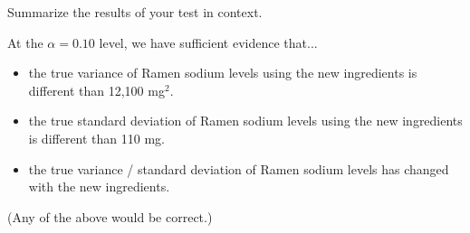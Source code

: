 \documentclass[noanswers]{exam}
\begin{document}
\begin{questions}
\begin{solution}[\stretch{1}]
	\end{solution}
	
	
	\question Summarize the results of your test in context.
	
	\begin{solution}[\stretch{1}]
	
	\vspace{1mm}
	
	At the $\alpha=0.10$ level, we have sufficient evidence that...
	\begin{itemize}
	\item the true variance of Ramen sodium levels using the new ingredients is different than 12,100 mg$^2$.
	\item the true standard deviation of Ramen sodium levels using the new ingredients is different than 110 mg.
	\item the true variance / standard deviation of Ramen sodium levels has changed with the new ingredients.
	\end{itemize}
	(Any of the above would be correct.)
	\end{solution}
	
\end{questions}
\end{document}
